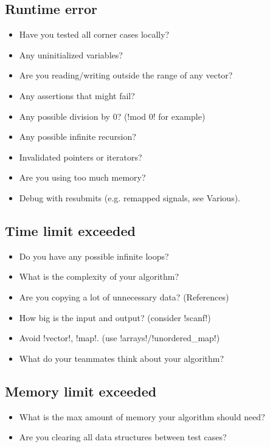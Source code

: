 \subsection{ Runtime error }
\begin{itemize}[topsep=0pt, partopsep=0pt, itemsep=2pt, parsep=0pt, left=0pt]
   \item Have you tested all corner cases locally?
   \item Any uninitialized variables?
   \item Are you reading/writing outside the range of any vector?
   \item Any assertions that might fail?
   \item Any possible division by 0? (\inlinecode!mod 0! for example)
   \item Any possible infinite recursion?
   \item Invalidated pointers or iterators?
   \item Are you using too much memory?
   \item Debug with resubmits (e.g. remapped signals, see Various).
\end{itemize}

\subsection{ Time limit exceeded }
\begin{itemize}[topsep=0pt, partopsep=0pt, itemsep=2pt, parsep=0pt, left=0pt]
   \item Do you have any possible infinite loops?
   \item What is the complexity of your algorithm?
   \item Are you copying a lot of unnecessary data? (References)
   \item How big is the input and output? (consider \inlinecode!scanf!)
   \item Avoid \inlinecode!vector!, \inlinecode!map!. (use
         \inlinecode!arrays!/\inlinecode!unordered_map!)
   \item What do your teammates think about your algorithm?
\end{itemize}

\subsection{ Memory limit exceeded }
\begin{itemize}[topsep=0pt, partopsep=0pt, itemsep=2pt, parsep=0pt, left=0pt]
   \item What is the max amount of memory your algorithm should need?
   \item Are you clearing all data structures between test cases?
\end{itemize}
